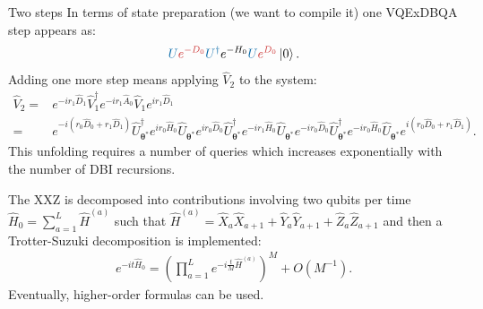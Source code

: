 \documentclass[aspectratio=169, 8pt, xcolor={svgnames}]{beamer}
\def\h{\hat H}
\def\D{\hat D}
\def\v{\hat V}
\def\bftheta{\boldsymbol{\theta}}
\def\vqes{\u_{\bftheta^*}}
\def\u{{\hat U}}
\def\D{\hat D}
\def\D{\mathcal D}
\def\D{\hat D}
\def\J{\hat A}
\begin{document}
\begin{frame}{Two steps}
In terms of state preparation (we want to compile it) one VQExDBQA step appears as:
$$ \textcolor{mediumpersianblue}{U}  \textcolor{persianred}{e^{-D_0}} \textcolor{mediumpersianblue}{U^{\dagger}} e^{-H_0}  
\textcolor{mediumpersianblue}{U}  \textcolor{persianred}{e^{D_0}} \ket{0}. $$
Adding one more step means applying $\hat{V}_2$ to the system:
\begin{align*}
   \hat V_2 
   =& e^{-ir_1 \D_1} \v_1^\dagger e^{-ir_1 \J_0} \v_1 e^{ir_1 \D_1}  \\
   =& 
   e^{-i(r_0 \D_0+r_1 \D_1)} \vqes^\dagger e^{ir_0 \h_0} \vqes e^{ir_0 \D_0} \vqes^\dagger e^{-ir_1 \h_0}\vqes
   e^{-ir_0 \D_0} \vqes^\dagger e^{-ir_0 \h_0} \vqes e^{i(r_0 \D_0+r_1 \D_1)}.
\end{align*}
This unfolding requires a number of queries which increases exponentially
with the number of DBI recursions.

\begin{tcolorbox}[colback=red!15, title=Compiling the hamiltonian evolutions]
The XXZ is decomposed into contributions involving two qubits per time $\hat{H}_0 = \sum_{a=1}^L \hat{H}^{(a)}$ such that
$\hat{H}^{(a)} = \hat{X}_a \hat{X}_{a+1} + \hat{Y}_a \hat{Y}_{a+1} + \hat{Z}_a \hat{Z}_{a+1}$ and then a Trotter-Suzuki decomposition
is implemented:
\begin{align*}
	e^{-it \h_0} = \left( \prod_{a=1}^L e^{-i\frac{t}{M}\h^{(a)}}\right)^M+O(M^{-1}).
\end{align*}
Eventually, higher-order formulas can be used.
\end{tcolorbox}
\end{frame}



\end{document}
